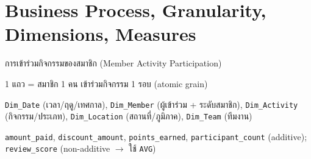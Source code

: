 \documentclass[11pt]{article}
\newcommand{\code}[1]{\texttt{#1}}
\begin{document}

\section{Business Process, Granularity, Dimensions, Measures}
\begin{description}[leftmargin=0pt,itemsep=1pt,topsep=1pt]
  \item[Business Process:] การเข้าร่วมกิจกรรมของสมาชิก (Member Activity Participation)
  \item[Granularity:] 1 แถว = สมาชิก 1 คน เข้าร่วมกิจกรรม 1 รอบ (atomic grain)
  \item[Dimensions (5):] \code{Dim_Date} (เวลา/ฤดู/เทศกาล), \code{Dim_Member} (ผู้เข้าร่วม + ระดับสมาชิก),
        \code{Dim_Activity} (กิจกรรม/ประเภท), \code{Dim_Location} (สถานที่/ภูมิภาค), \code{Dim_Team} (ทีมงาน)
  \item[Measures:] \code{amount_paid}, \code{discount_amount}, \code{points_earned}, \code{participant_count}
        (additive); \code{review_score} (non-additive $\to$ ใช้ \code{AVG})
\end{description}

\vspace{6pt}
\end{document}
